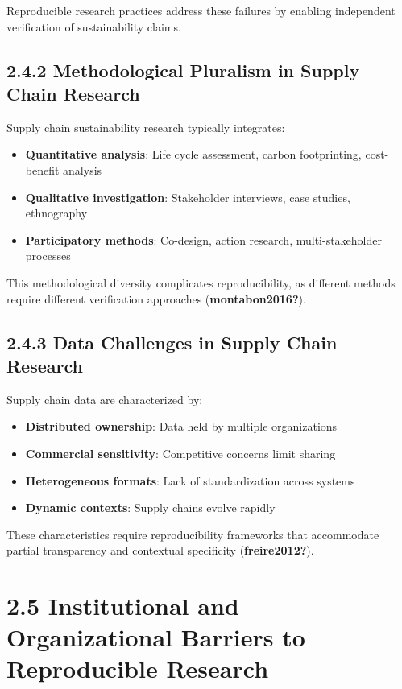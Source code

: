 \documentclass[
  oneside,
  open=any]{scrbook}
\providecommand{\tightlist}{%
  \setlength{\itemsep}{0pt}\setlength{\parskip}{0pt}}\usepackage{longtable,booktabs,array}
\begin{document}
Reproducible research practices address these failures by enabling
independent verification of sustainability claims.

\subsection{2.4.2 Methodological Pluralism in Supply Chain
Research}\label{methodological-pluralism-in-supply-chain-research}

Supply chain sustainability research typically integrates:

\begin{itemize}
\tightlist
\item
  \textbf{Quantitative analysis}: Life cycle assessment, carbon
  footprinting, cost-benefit analysis
\item
  \textbf{Qualitative investigation}: Stakeholder interviews, case
  studies, ethnography
\item
  \textbf{Participatory methods}: Co-design, action research,
  multi-stakeholder processes
\end{itemize}

This methodological diversity complicates reproducibility, as different
methods require different verification approaches
(\textbf{montabon2016?}).

\subsection{2.4.3 Data Challenges in Supply Chain
Research}\label{data-challenges-in-supply-chain-research}

Supply chain data are characterized by:

\begin{itemize}
\tightlist
\item
  \textbf{Distributed ownership}: Data held by multiple organizations
\item
  \textbf{Commercial sensitivity}: Competitive concerns limit sharing
\item
  \textbf{Heterogeneous formats}: Lack of standardization across systems
\item
  \textbf{Dynamic contexts}: Supply chains evolve rapidly
\end{itemize}

These characteristics require reproducibility frameworks that
accommodate partial transparency and contextual specificity
(\textbf{freire2012?}).

\section{2.5 Institutional and Organizational Barriers to Reproducible
Research}\label{institutional-and-organizational-barriers-to-reproducible-research}
\end{document}
